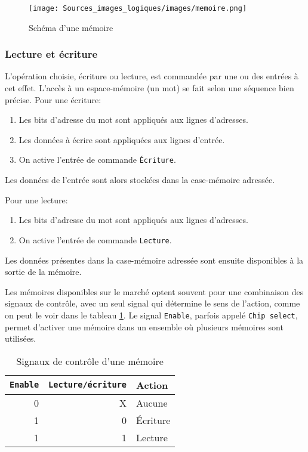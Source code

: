 \documentclass[11pt]{article}
\begin{document}
\begin{figure}[htbp]
\centering
\texttt{[image: Sources\_images\_logiques/images/memoire.png]}
\caption{\label{fig:orgf078c17}Schéma d'une mémoire}
\end{figure}

\subsubsection{Lecture et écriture}
\label{sec:org2f269ce}

L'opération choisie, écriture ou lecture, est commandée par une ou des
entrées à cet effet. L'accès à un espace-mémoire (un mot) se fait
selon une séquence bien précise. Pour une écriture:

\begin{enumerate}
\item Les bits d'adresse du mot sont appliqués aux lignes d'adresses.
\item Les données à écrire sont appliquées aux lignes d'entrée.
\item On active l'entrée de commande \texttt{Écriture}.
\end{enumerate}

Les données de l'entrée sont alors stockées dans la case-mémoire adressée.

Pour une lecture:

\begin{enumerate}
\item Les bits d'adresse du mot sont appliqués aux lignes d'adresses.
\item On active l'entrée de commande \texttt{Lecture}.
\end{enumerate}

Les données présentes dans la case-mémoire adressée sont ensuite
disponibles à la sortie de la mémoire.

Les mémoires disponibles sur le marché optent souvent pour une
combinaison des signaux de contrôle, avec un seul signal qui détermine
le sens de l'action, comme on peut le voir dans le tableau
\ref{tab:org4854c9a}. Le signal \texttt{Enable}, parfois appelé \texttt{Chip
select}, permet d'activer une mémoire dans un ensemble où plusieurs
mémoires sont utilisées.

\begin{table}[htbp]
\caption{\label{tab:org4854c9a}Signaux de contrôle d'une mémoire}
\centering
\begin{tabular}{rrl}
\texttt{Enable} & \texttt{Lecture/écriture} & Action\\
\hline
0 & X & Aucune\\
1 & 0 & Écriture\\
1 & 1 & Lecture\\
\end{tabular}
\end{table}
\end{document}
